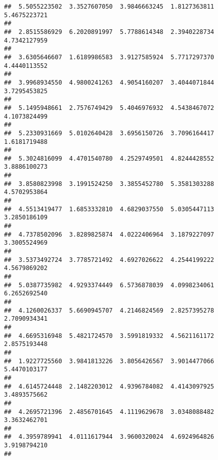 \documentclass[]{article}
\begin{document}
\begin{verbatim}
##  5.5055223502  3.3527607050  3.9846663245  1.8127363811  5.4675223721 
##                                                                       
##  2.8515586929  6.2020891997  5.7788614348  2.3940228734  4.7342127959 
##                                                                       
##  3.6305646607  1.6189986583  3.9127585924  5.7717297370  4.4440113552 
##                                                                       
##  3.9968934550  4.9800241263  4.9054160207  3.4044071844  3.7295453825 
##                                                                       
##  5.1495948661  2.7576749429  5.4046976932  4.5438467072  4.1073824499 
##                                                                       
##  5.2330931669  5.0102640428  3.6956150726  3.7096164417  1.6181719488 
##                                                                       
##  5.3024816099  4.4701540780  4.2529749501  4.8244428552  3.8886100273 
##                                                                       
##  3.8580823998  3.1991524250  3.3855452780  5.3581303288  4.5702953864 
##                                                                       
##  4.5513419477  1.6853332810  4.6829037550  5.0305447113  3.2850186109 
##                                                                       
##  4.7378502096  3.8289825874  4.0222406964  3.1879227097  3.3005524969 
##                                                                       
##  3.5373492724  3.7785721492  4.6927026622  4.2544199222  4.5679869202 
##                                                                       
##  5.0387735982  4.9293374449  6.5736878039  4.0998234061  6.2652692540 
##                                                                       
##  4.1260026337  5.6690945707  4.2146824569  2.8257395278  2.7090934341 
##                                                                       
##  4.6695316948  5.4821724570  3.5991819332  4.5621161172  2.8575193448 
##                                                                       
##  1.9227725560  3.9841813226  3.8056426567  3.9014477066  5.4470103177 
##                                                                       
##  4.6145724448  2.1482203012  4.9396784082  4.4143097925  3.4893575662 
##                                                                       
##  4.2695721396  2.4856701645  4.1119629678  3.0348088482  3.3632462701 
##                                                                       
##  4.3959789941  4.0111617944  3.9600320024  4.6924964826  3.9198794210 
##                                                                       

\end{verbatim}
\end{document}
